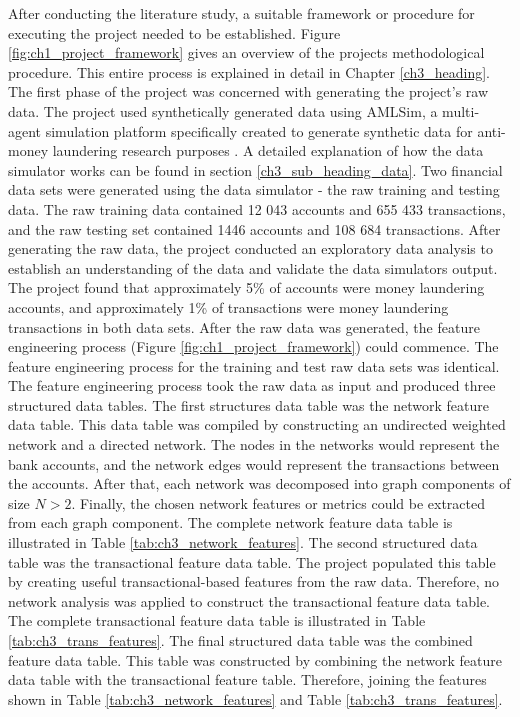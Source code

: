 After conducting the literature study, a suitable framework or procedure for executing the project needed to be established. Figure \ref{fig:ch1_project_framework} gives an overview of the projects methodological procedure. This entire process is explained in detail in Chapter \ref{ch3_heading}. The first phase of the project was concerned with generating the project's raw data. The project used synthetically generated data using AMLSim, a multi-agent simulation platform specifically created to generate synthetic data for anti-money laundering research purposes \citep{AMLSim}. A detailed explanation of how the data simulator works can be found in section \ref{ch3_sub_heading_data}. Two financial data sets were generated using the data simulator - the raw training and testing data. The raw training data contained 12 043 accounts and 655 433 transactions, and the raw testing set contained 1446 accounts and 108 684 transactions. After generating the raw data, the project conducted an exploratory data analysis to establish an understanding of the data and validate the data simulators output. The project found that approximately 5\% of accounts were money laundering accounts, and  approximately 1\% of transactions were money laundering transactions in both data sets.
After the raw data was generated, the feature engineering process (Figure \ref{fig:ch1_project_framework}) could commence. The feature engineering process for the training and test raw data sets was identical. The feature engineering process took the raw data as input and produced three structured data tables. The first structures data table was the network feature data table. This data table was compiled by constructing an undirected weighted network and a directed network. The nodes in the networks would represent the bank accounts, and the network edges would represent the transactions between the accounts. After that, each network was decomposed into graph components of size $N>2$. Finally, the chosen network features or metrics could be extracted from each graph component. The complete network feature data table is illustrated in Table \ref{tab:ch3_network_features}. The second structured data table was the transactional feature data table. The project populated this table by creating useful transactional-based features from the raw data. Therefore, no network analysis was applied to construct the transactional feature data table. The complete transactional feature data table is illustrated in Table \ref{tab:ch3_trans_features}. The final structured data table was the combined feature data table. This table was constructed by combining the network feature data table with the transactional feature table. Therefore, joining the features shown in Table \ref{tab:ch3_network_features} and Table \ref{tab:ch3_trans_features}.\\

